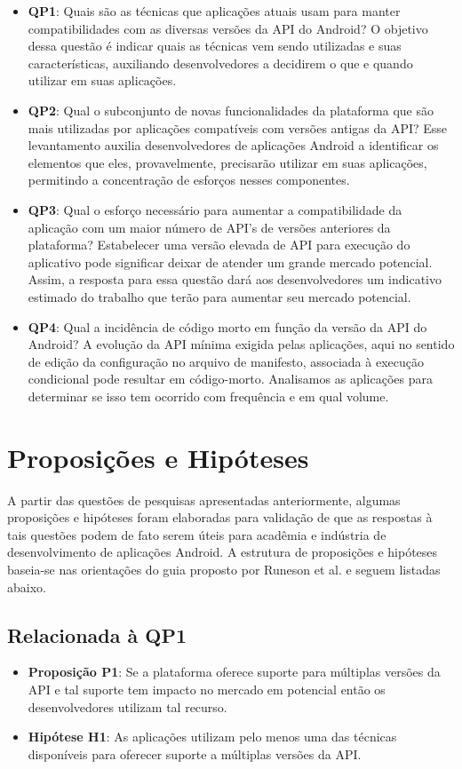 \begin{itemize}
	\item \textbf{QP1}: Quais são as técnicas que aplicações atuais usam para manter
	compatibilidades com as diversas versões da API do Android? O objetivo dessa questão
	é indicar quais as técnicas vem sendo utilizadas e suas características, auxiliando
	desenvolvedores a decidirem o que e quando utilizar em suas aplicações.
	\item \textbf{QP2}: Qual o subconjunto de novas funcionalidades da plataforma que são
	mais utilizadas por aplicações compatíveis com versões antigas da API? Esse levantamento
	auxilia desenvolvedores de aplicações Android a identificar os elementos que eles, provavelmente,
	precisarão utilizar em suas aplicações, permitindo a concentração de esforços nesses componentes.
	\item \textbf{QP3}: Qual o esforço necessário para aumentar a compatibilidade da aplicação 
	com um maior número de API's de versões anteriores da plataforma? Estabelecer uma versão
	elevada de API para execução do aplicativo pode significar deixar de atender um grande
	mercado potencial. Assim, a resposta para essa questão dará aos desenvolvedores um
	indicativo estimado do trabalho que terão para aumentar seu mercado potencial.
	\item \textbf{QP4}: Qual a incidência de código morto em função da versão da API do Android? 
	A evolução da API mínima exigida pelas aplicações, aqui no sentido de edição da configuração
	no arquivo de manifesto, associada à execução condicional pode resultar em código-morto.
	Analisamos as aplicações para determinar se isso tem ocorrido com frequência e em qual volume.
\end{itemize}

\section{Proposições e Hipóteses} \label{sec:hipoteses}

A partir das questões de pesquisas apresentadas anteriormente, algumas proposições
e hipóteses foram elaboradas para validação de que as respostas à tais questões podem
de fato serem úteis para acadêmia e indústria de desenvolvimento de aplicações Android.
A estrutura de proposições e hipóteses baseia-se nas orientações do guia proposto por 
Runeson et al. \cite{Runeson2012} e seguem listadas abaixo.

\subsection{Relacionada à QP1}
	\begin{itemize}
		\item \textbf{Proposição P1}: Se a plataforma oferece suporte para múltiplas versões
		da API e tal suporte tem impacto no mercado em potencial então os desenvolvedores
		utilizam tal recurso.
		\item \textbf{Hipótese H1}: As aplicações utilizam pelo menos uma das técnicas disponíveis
		para oferecer suporte a múltiplas versões da API.
	\end{itemize}

